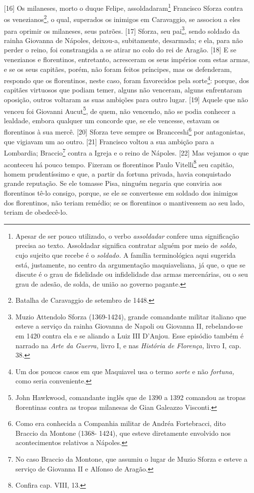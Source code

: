 {[}16{]} Os milaneses, morto o duque Felipe, assoldadaram\footnote{Apesar
  de ser pouco utilizado, o verbo \emph{assoldadar} confere uma
  significação precisa ao texto. Assoldadar significa contratar alguém
  por meio de \emph{soldo}, cujo sujeito que recebe é o \emph{soldado.}
  A família terminológica aqui sugerida está, justamente, no centro da
  argumentação maquiaveliana, já que, o que se discute é o grau de
  fidelidade ou infidelidade das armas mercenárias, ou o seu grau de
  adesão, de solda, de união ao governo pagante.} Francisco Sforza
contra os venezianos\footnote{Batalha de Caravaggio de setembro de 1448.},
o qual, superados os inimigos em Caravaggio, se associou a eles para
oprimir os milaneses, seus patrões. {[}17{]} Sforza, seu pai\footnote{Muzio
  Attendolo Sforza (1369-1424), grande comandante militar italiano que
  esteve a serviço da rainha Giovanna de Napoli ou Giovanna II,
  rebelando-se em 1420 contra ela e se aliando a Luiz III D'Anjou. Esse
  episódio também é narrado na \emph{Arte da Guerra,} livro I, e nas
  \emph{História de Florença,} livro I, cap. 38.}, sendo soldado da
rainha Giovanna de Nápoles, deixou-a, subitamente, desarmada; e ela,
para não perder o reino, foi constrangida a se atirar no colo do rei de
Aragão. {[}18{]} E se venezianos e florentinos, entretanto, acresceram
os seus impérios com estas armas, e se os seus capitães, porém, não
foram feitos príncipes, mas os defenderam, respondo que os florentinos,
neste caso, foram favorecidos pela sorte\footnote{Um dos poucos casos em
  que Maquiavel usa o termo \emph{sorte} e não \emph{fortuna,} como
  seria conveniente.}: porque, dos capitães virtuosos que podiam temer,
alguns não venceram, alguns enfrentaram oposição, outros voltaram as
suas ambições para outro lugar. {[}19{]} Aquele que não venceu foi
Giovanni Aucut\footnote{John Hawkwood, comandante inglês que de 1390 a
  1392 comandou as tropas florentinas contra as tropas milanesas de Gian
  Galeazzo Visconti.}, de quem, não vencendo, não se podia conhecer a
lealdade, embora qualquer um concorde que, se ele vencesse, estavam os
florentinos à sua mercê. {[}20{]} Sforza teve sempre os
Brancceshi\footnote{Como era conhecida a Companhia militar de Andréa
  Fortebracci, dito Braccio da Montone (1368- 1424), que esteve
  diretamente envolvido nos acontecimentos relativos a Nápoles.} por
antagonistas, que vigiavam um ao outro. {[}21{]} Francisco voltou a sua
ambição para a Lombardia; Braccio\footnote{No caso Braccio da Montone,
  que assumiu o lugar de Muzio Sforza e esteve a serviço de Giovanna II
  e Alfonso de Aragão.} contra a Igreja e o reino de Nápoles. {[}22{]}
Mas vejamos o que aconteceu há pouco tempo. Fizeram os florentinos Paulo
Vitelli\footnote{Confira cap. VIII, 13.} seu capitão, homem
prudentíssimo e que, a partir da fortuna privada, havia conquistado
grande reputação. Se ele tomasse Pisa, ninguém negaria que conviria aos
florentinos tê-lo consigo, porque, se ele se convertesse em soldado dos
inimigos dos florentinos, não teriam remédio; se os florentinos o
mantivessem ao seu lado, teriam de obedecê-lo.

